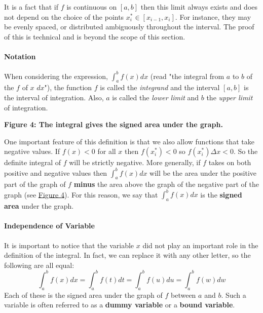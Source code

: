 It is a fact that if $f$ is continuous on $[a,b]$ then this limit always exists and does not depend on the choice of the points $x_i^* \in [x_{i-1}, x_i]$. For instance, they may be evenly spaced, or distributed ambiguously throughout the interval. The proof of this is technical and is beyond the scope of this section.



\paragraph{Notation}



When considering the expression, $\int_a^b f(x) dx$ (read "the integral from $a$ to $b$ of the $f$ of $x$ $dx$"), the function $f$ is called the \textit{integrand} and the interval $[a,b]$ is the interval of integration. Also, $a$ is called the \textit{lower limit} and $b$ the \textit{upper limit} of integration.




\textbf{Figure 4: The integral gives the signed area under the graph.}



One important feature of this definition is that we also allow functions that take negative values. If $f(x) < 0$ for all $x$ then $f(x_i^*) < 0$ so $f(x_{i}^\ast) \Delta x < 0$. So the definite integral of $f$ will be strictly negative. More generally, if $f$ takes on both positive and negative values then $\int_a^b f(x) dx$ will be the area under the positive part of the graph of $f$ \textbf{minus} the area above the graph of the negative part of the graph (see \href{https://upload.wikimedia.org/wikipedia/commons/thumb/f/f8/Signed-area.png/300px-Signed-area.png}{Figure 4}). For this reason, we say that $\int_a^b f(x) dx$ is the \textbf{signed area} under the graph.



\paragraph{Independence of Variable}



It is important to notice that the variable $x$ did not play an important role in the definition of the integral. In fact, we can replace it with any other letter, so the following are all equal:
$$
\int_a^b f(x) dx = \int_a^b f(t) dt = \int_a^b f(u) du = \int_a^b f(w) dw
$$
Each of these is the signed area under the graph of $f$ between $a$ and $b$. Such a variable is often referred to as a \textbf{dummy variable} or a \textbf{bound variable}.



